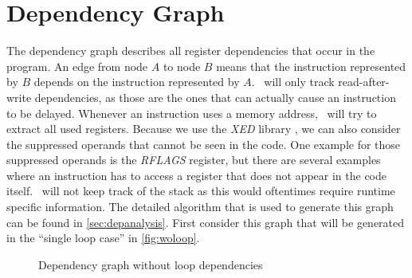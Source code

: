 \FloatBarrier

\section{Dependency Graph}
The dependency graph describes all register dependencies that occur in the program. An edge from node $A$ to node $B$ means that the instruction represented by $B$ depends on the instruction represented by $A$. \suaca\ will only track read-after-write dependencies, as those are the ones that can actually cause an instruction to be delayed. Whenever an instruction uses a memory address, \suaca\ will try to extract all used registers. Because we use the \emph{XED} library \cite{xed}, we can also consider the suppressed operands that cannot be seen in the code. One example for those suppressed operands is the \emph{RFLAGS} register, but there are several examples where an instruction has to access a register that does not appear in the code itself. \suaca\ will not keep track of the stack as this would oftentimes require runtime specific information. The detailed algorithm that is used to generate this graph can be found in \autoref{sec:depanalysis}. First consider this graph that will be generated in the ``single loop case'' in \autoref{fig:woloop}.\\

\setlength{\abovecaptionskip}{-5pt}
\begin{figure}
\centering
{}
\caption{Dependency graph without loop dependencies}
\label{fig:woloop}
\end{figure}


